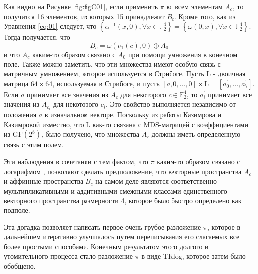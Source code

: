 Как видно на Рисунке \ref{fig:figC01}, если применить $\pi$ ко всем элементам $A_{c}$, то получится 16 элементов, из которых 15 принадлежат $B_{c}$. Кроме того, как из Уравнения \eqref{eq:01} следует, что $\left\{\alpha^{-1}(x, 0), \forall x \in \mathbb{F}_{2}^{4}\right\}=\left\{\omega(0, x), \forall x \in \mathbb{F}_{2}^{4}\right\}$. Тогда получается, что
$$
B_{c}=\omega\left(\nu_{1}(c), 0\right) \oplus A_{0}
$$
и что $A_{c}$ каким-то образом связано с $A_{0}$ при помощи умножения в конечном поле. Также можно заметить, что эти множества имеют особую связь с матричным умножением, которое используется в Стрибоге. Пусть L - двоичная матрица $64 \times 64$, используемая в Стрибоге, и пусть $[a, 0, \ldots, 0] \times \mathrm{L}=\left[a_{0}^{\prime}, \ldots, a_{7}^{\prime}\right]$. Если $a$ принимает все значения из $A_{c}$ для некоторого $c \in \mathbb{F}_{2}^{4}$, то $a_{i}^{\prime}$ принимает все значения из $A_{c_{i}}$ для некоторого $c_{i}$. Это свойство выполняется независимо от положения $a$ в изначальном векторе. Поскольку из работы Казимрова и Казимровой \cite{KK13} изместно, что L как-то связана с MDS-матрицей с коэффициентами из $\mathrm{GF}\left(2^{8}\right)$, было получено, что множества $A_{c}$ должны иметь определенную связь с этим полем.

Эти наблюдения в сочетании с тем фактом, что $\pi$ каким-то образом связано с логарифмом \cite{PU16}, позволяют сделать предположение, что векторные пространства $A_{c}$ и аффинные пространства $B_{c}$ на самом деле являются соответственно мультипликативными и аддитивными смежными классами единственного векторного пространства размерности 4, которое было быстро определено как подполе.

Эта догадка позволяет написать первое очень грубое разложение $\pi$, которое в дальнейшем итеративно улучшалось путем переписывания его слагаемых все более простыми способами. Конечным результатом этого долгого и утомительного процесса стало разложение $\pi$ в виде TKlog, которое затем было обобщено.